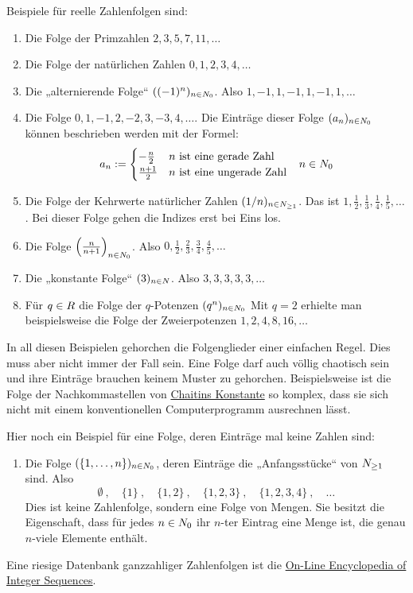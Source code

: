 \begin{bsp}
    Beispiele für reelle Zahlenfolgen sind:
    \begin{enumerate}[(1)]
        \item Die Folge der Primzahlen $2,3,5,7,11,\dots$
        \item Die Folge der natürlichen Zahlen $0,1,2,3,4,\dots$
        \item Die „alternierende Folge“ $((-1)^n)_{n\in \relax N_0}$. Also $1,-1,1,-1,1,-1,1,\dots$
        \item Die Folge $0,1,-1,2,-2,3,-3,4,\dots$. Die Einträge dieser Folge $(a_n)_{n\in \relax N_0}$ können beschrieben werden mit der Formel:
        \begin{align*}
            a_n := \begin{cases}
                -\frac{n}{2} & n\ \text{ist eine gerade Zahl} \\
                \frac{n+1}{2} & n\ \text{ist eine ungerade Zahl}
            \end{cases} && n \in \relax N_0
        \end{align*}
        \item Die Folge der Kehrwerte natürlicher Zahlen $(1/n)_{n\in \relax N_{\ge 1}}$. Das ist  $1,\frac{1}{2},\frac{1}{3},\frac{1}{4},\frac{1}{5},\dots$. Bei dieser Folge gehen die Indizes erst bei Eins los.
        \item Die Folge $\left(\frac{n}{n+1}\right)_{n\in \relax N_0}$. Also $0,\frac{1}{2},\frac{2}{3},\frac{3}{4},\frac{4}{5},\dots$
        \item Die „konstante Folge“ $(3)_{n\in \relax N}$. Also $3,3,3,3,3,\dots$
        \item Für $q\in \relax R$ die Folge der $q$-Potenzen $(q^n)_{n\in \relax N_0}$ Mit $q=2$ erhielte man beispielsweise die Folge der Zweierpotenzen $1,2,4,8,16,\dots$
    \end{enumerate}
    In all diesen Beispielen gehorchen die Folgenglieder einer einfachen Regel. Dies muss aber nicht immer der Fall sein. Eine Folge darf auch völlig chaotisch sein und ihre Einträge brauchen keinem Muster zu gehorchen. Beispielsweise ist die Folge der Nachkommastellen von \href{https://de.wikipedia.org/wiki/Chaitinsche_Konstante}{Chaitins Konstante} so komplex, dass sie sich nicht mit einem konventionellen Computerprogramm ausrechnen lässt.
        
    Hier noch ein Beispiel für eine Folge, deren Einträge mal keine Zahlen sind:
    \begin{enumerate}[resume*]
        \item Die Folge $(\{1,\dots , n\})_{n\in \relax N_0}$, deren Einträge die „Anfangsstücke“ von $\relax N_{\ge 1}$ sind. Also
            \[ \emptyset\ ,\quad \{1\}\ ,\quad \{1,2\}\ ,\quad \{1,2,3\}\ ,\quad \{1,2,3,4\}\ , \quad \dots \]
        Dies ist keine Zahlenfolge, sondern eine Folge von Mengen. Sie besitzt die Eigenschaft, dass für jedes $n\in \relax N_0$ ihr $n$-ter Eintrag eine Menge ist, die genau $n$-viele Elemente enthält.
    \end{enumerate}
    Eine riesige Datenbank ganzzahliger Zahlenfolgen ist die \href{https://oeis.org/}{On-Line Encyclopedia of Integer Sequences}.
\end{bsp}


